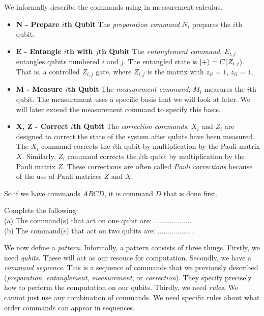 We informally describe the commands using in measurement calculus. 

\begin{itemize}
\item \textbf{N - Prepare $i$th Qubit} The \textit{preparation command} $N_i$ prepares 
the $i$th qubit. 
\item \textbf{E - Entangle $i$th with $j$th Qubit} The \textit{entanglement command}, $E_{i,j}$ 
entangles qubits numbered $i$ and $j$. The entangled state is $\left|+\right\rangle = C(Z_{i,j})$. 
That is, a controlled $Z_{i,j}$ gate, where $Z_{i,j}$ is the matrix 
with $z_{ii} = 1$, $z_{ii} = 1$,
\item \textbf{M - Measure $i$th Qubit} The \textit{measurement command}, $M_{i}$ 
measures the $i$th qubit. The measurement uses a specific basis that we will 
look at later. We will later extend the measurement command to specify this basis.
\item \textbf{X, Z - Correct $i$th Qubit} The \textit{correction commands}, $X_{i}$ 
and $Z_{i}$ are designed to correct the state of the system after qubits have been measured. 
The $X_i$ command corrects the $i$th qubit by multiplication by the Pauli matrix $X$. 
Similarly, $Z_i$ command corrects the $i$th qubit by multiplication by the Pauli matrix $Z$. 
These corrections are often called \textit{Pauli corrections} because of the use of Pauli 
matrices $Z$ and $X$.
\end{itemize}

\frmrule

So if we have commands $ABCD$, it is command $D$ that is done first. 

\frmrule

\begin{example}
Complete the following:\\
(a) The command(s) that act on one qubit are: ...................\\
(b) The command(s) that act on two qubits are: ...................
\end{example}

\frmrule

We now define a \textit{pattern}. 
Informally, a pattern consists of three things. Firstly, we need \textit{qubits}. 
These will act as our resouce for computation. Secondly, 
we have a \textit{command sequence}. This is a sequence of commands 
that we previously described (\textit{preparation}, \textit{entanglement}, 
\textit{measurement}, or \textit{correction}). They specify precisely how to 
perform the computation on our qubits.  Thirdly, we need \textit{rules}. 
We cannot just use any combination of commands. We need specific rules 
about what order commands can appear in sequences.


